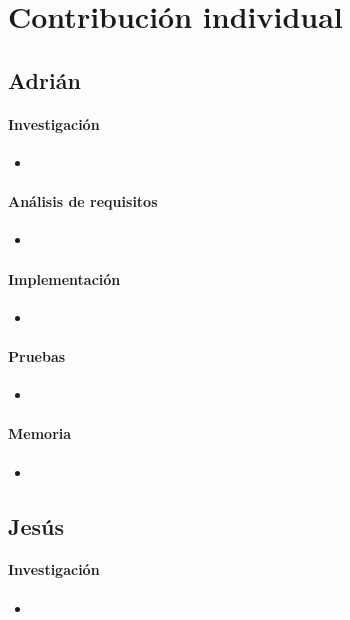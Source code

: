 \chapter{Contribución individual}

\section{Adrián}
\subsubsection{Investigación}
\begin{itemize}
	\item 
\end{itemize}
\subsubsection{Análisis de requisitos}
\begin{itemize}
	\item 
\end{itemize}
\subsubsection{Implementación}
\begin{itemize}
	\item 
\end{itemize}
\subsubsection{Pruebas}
\begin{itemize}
	\item 
\end{itemize}
\subsubsection{Memoria}
\begin{itemize}
	\item 
\end{itemize}

\section{Jesús}
\subsubsection{Investigación}
\begin{itemize}
	\item 
\end{itemize}
